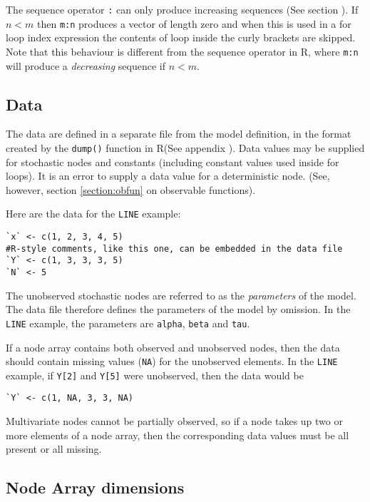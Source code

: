 \documentclass[11pt, a4paper, titlepage]{report}
\newcommand{\R}{\textsf{R}}
\begin{document}
The sequence operator \verb+:+ can only produce increasing sequences
(See section \label{base:functions}). If $n < m$ then \verb+m:n+
produces a vector of length zero and when this is used in a for loop
index expression the contents of loop inside the curly brackets are
skipped. Note that this behaviour is different from the sequence
operator in R, where \verb+m:n+ will produce a {\em decreasing}
sequence if $n < m$.

\subsection{Data}
\label{section:data}

The data are defined in a separate file from the model definition, in
the format created by the \texttt{dump()} function in \R (See appendix
\cite{appendix:data}).  Data values may be supplied for stochastic
nodes and constants (including constant values used inside for
loops). It is an error to supply a data value for a deterministic
node. (See, however, section \ref{section:obfun} on observable
functions).

Here are the data for the \verb+LINE+ example:
\begin{verbatim}
`x` <- c(1, 2, 3, 4, 5)
#R-style comments, like this one, can be embedded in the data file
`Y` <- c(1, 3, 3, 3, 5)
`N` <- 5
\end{verbatim}

The unobserved stochastic nodes are referred to as the {\em
  parameters} of the model. The data file therefore defines the
parameters of the model by omission. In the \verb+LINE+ example, the
parameters are \texttt{alpha}, \texttt{beta} and \texttt{tau}.

If a node array contains both observed and unobserved nodes, then the
data should contain missing values (\texttt{NA}) for the unobserved
elements. In the \verb+LINE+ example, if \verb+Y[2]+ and \verb+Y[5]+
were unobserved, then the data would be
\begin{verbatim}
`Y` <- c(1, NA, 3, 3, NA)
\end{verbatim}
Multivariate nodes cannot be partially observed, so if a node takes up
two or more elements of a node array, then the corresponding data
values must be all present or all missing.

\subsection{Node Array dimensions}
\end{document}

